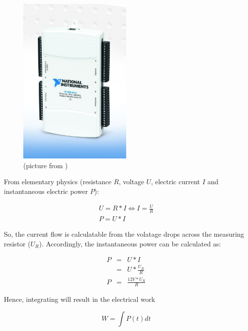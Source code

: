 \begin{figure}
  \centering
    \includegraphics[width=0.5\textwidth]{fig/NI-USB-6218.jpg}
  \caption{\JWPni{} (picture from )}
  \label{fig:ni}
\end{figure}


\label{sec:calc-work}

From elementary physics (resistance $R$, voltage $U$, electric current $I$ and
instantaneous electric power $P$):

\begin{eqnarray}
     U = R * I \iff I = \frac{U}{R} \\
     P = U * I
\end{eqnarray}

So, the current flow is calculatable from the volatage drops across the
measuring resistor ($U_R$). Accordingly, the instantaneous power can be
calculated as:

\begin{eqnarray}
P & = & U * I \\
  & = & U * \frac{U_R}{R} \\
P & = & \frac{12V * U_R}{R}
\end{eqnarray}

Hence, integrating will result in the electrical work

\begin{equation}
  W = \int P(t)dt
\end{equation}


